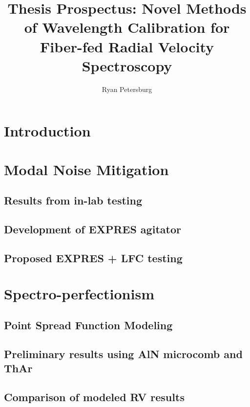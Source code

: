 \documentclass[modern]{aastex61}
\begin{document}
\title{Thesis Prospectus: Novel Methods of Wavelength Calibration for Fiber-fed Radial Velocity Spectroscopy}

\author{Ryan Petersburg}

\begin{abstract}

\end{abstract}

\pagebreak

\section{Introduction}

\section{Modal Noise Mitigation}

\subsection{Results from in-lab testing}

\subsection{Development of EXPRES agitator}

\subsection{Proposed EXPRES + LFC testing}

\section{Spectro-perfectionism}

\subsection{Point Spread Function Modeling}

\subsection{Preliminary results using AlN microcomb and ThAr}

\subsection{Comparison of modeled RV results}
\end{document}
